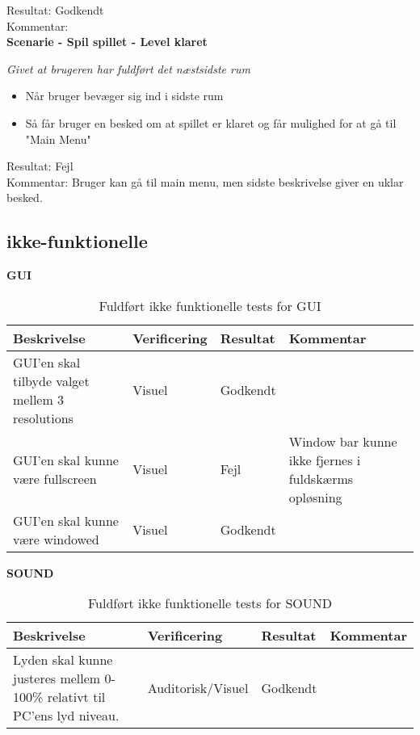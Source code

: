 Resultat: Godkendt\\
Kommentar:\\

\textbf{Scenarie - Spil spillet - Level klaret}

\textit{Givet at brugeren har fuldført det næstsidste rum}

\begin{itemize}
  \item Når bruger bevæger sig ind i sidste rum
  \item Så får bruger en besked om at spillet er klaret og får mulighed for at gå til "Main Menu"
\end{itemize}

Resultat: Fejl\\
Kommentar: Bruger kan gå til main menu, men sidste beskrivelse giver en uklar besked.\\

\subsection{ikke-funktionelle}
\textbf{GUI}
\begin{table}[H]
\caption{ Fuldført ikke funktionelle tests for GUI}
\label{tab:}
\begin{tabular}{|p{3cm}|p{3cm}|p{3cm}|p{3cm}|}
\hline
Beskrivelse & Verificering & Resultat & Kommentar \\
\hline
GUI'en skal tilbyde valget mellem 3 resolutions & Visuel & Godkendt & \\
\hline
GUI'en skal kunne være fullscreen & Visuel & Fejl & Window bar kunne ikke fjernes i fuldskærms opløsning\\
\hline
GUI'en skal kunne være windowed & Visuel & Godkendt & \\
\hline
\end{tabular}
\end{table}

\textbf{SOUND}
\begin{table}[H]
\caption{ Fuldført ikke funktionelle tests for SOUND}
\label{tab:}
\begin{tabular}{|p{3cm}|p{3cm}|p{3cm}|p{3cm}|}
\hline
Beskrivelse & Verificering & Resultat & Kommentar \\
\hline
Lyden skal kunne justeres mellem 0-100\% relativt til PC'ens lyd niveau. & Auditorisk/Visuel & Godkendt & \\
\hline
\end{tabular}
\end{table}

